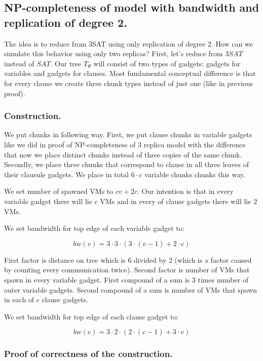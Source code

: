 \subsection{NP-completeness of model with bandwidth and replication of
  degree 2.
}

The idea is to reduce from 3SAT using only replication of degree
$2$. How can we simulate this behavior using only two replicas? First,
let's reduce from $3SAT$ instead of $SAT$. Our tree $T_{\Psi}$
will consist of two types of gadgets: gadgets for variables and
gadgets for clauses. Most fundamental conceptual difference is that
for every clause we create three chunk types instead of just one (like
in previous proof). 

\subsubsection{Construction.}

We put chunks in following way. First, we put clause chunks in
variable gadgets like we did in proof of NP-completeness of 3 replica
model with the difference that now we place distinct chunks instead of
three copies of the same chunk.  Secondly, we place three chunks that
correspond to clause in all three leaves of their clausule gadgets. We
place in total $6 \cdot c$ variable chunks chunks this way.

We set number of spawned VMs to $cv + 2c$. Our intention is that in
every variable gadget there will lie $c$ VMs and in every of clause
gadgets there will lie $2$ VMs.

We set bandwidth for top edge of each variable gadget to:

$$ bw(v) = 3  \cdot  3  \cdot  (3  \cdot  (v - 1) + 2  \cdot  c) $$


First factor is distance on tree which is 6 divided by 2 (which is a
factor caused by counting every communication twice). Second factor is
number of VMs that spawn in every variable gadget. First compound of a
sum is 3 times number of outer variable gadgets. Second compound of a
sum is number of VMs that spawn in each of c clause gadgets.

We set bandwidth for top edge of each clause gadget to:

$$ bw(c) = 3  \cdot  2  \cdot  (2  \cdot  (c - 1) + 3  \cdot  v) $$

\subsubsection{Proof of correctness of the construction.}

